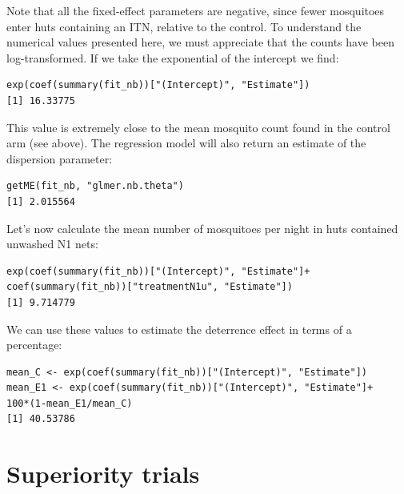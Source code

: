 \documentclass[11pt]{article}
\begin{document}
Note that all the fixed-effect parameters are negative, since fewer mosquitoes enter huts containing an ITN, relative to the control. To understand the numerical values presented here, we must appreciate that the counts have been log-transformed. If we take the exponential of the intercept we find:
\begin{verbatim}
exp(coef(summary(fit_nb))["(Intercept)", "Estimate"])
[1] 16.33775
\end{verbatim}
This value is extremely close to the mean mosquito count found in the control arm (see above). The regression model will also return an estimate of the dispersion parameter:
\begin{verbatim}
getME(fit_nb, "glmer.nb.theta")
[1] 2.015564
\end{verbatim}
Let's now calculate the mean number of mosquitoes per night in huts contained unwashed N1 nets:
\begin{verbatim}
exp(coef(summary(fit_nb))["(Intercept)", "Estimate"]+
coef(summary(fit_nb))["treatmentN1u", "Estimate"])
[1] 9.714779
\end{verbatim}
We can use these values to estimate the deterrence effect in terms of a percentage:
\begin{verbatim}
mean_C <- exp(coef(summary(fit_nb))["(Intercept)", "Estimate"])
mean_E1 <- exp(coef(summary(fit_nb))["(Intercept)", "Estimate"]+
100*(1-mean_E1/mean_C)
[1] 40.53786
\end{verbatim}

\section{Superiority trials}
\end{document}
